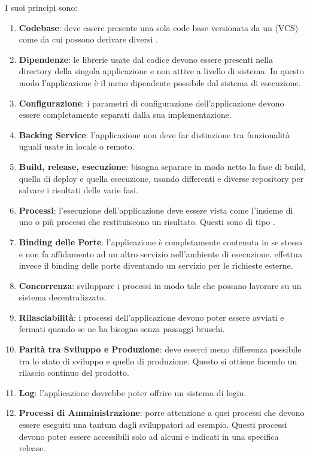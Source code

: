 I suoi principi sono:

\begin{enumerate}
	\item \textbf{Codebase}: deve essere presente una sola code base versionata da un  (VCS) come  da cui
	possono derivare diversi .
	\item \textbf{Dipendenze}: le librerie usate dal codice devono essere presenti nella directory della singola applicazione e non attive a livello di sistema. In questo modo l'applicazione è il meno dipendente possibile dal sistema di esecuzione.
	\item \textbf{Configurazione}: i parametri di configurazione dell'applicazione devono essere completamente separati dalla sua implementazione.
	\item \textbf{Backing Service}: l'applicazione non deve far distinzione tra funzionalità uguali usate in locale o remoto.
	\item \textbf{Build, release, esecuzione}: bisogna separare in modo netto la fase di build, quella di deploy e quella esecuzione, usando  differenti e diverse repository per salvare i risultati delle varie fasi.
	\item \textbf{Processi}: l'esecuzione dell'applicazione deve essere vista come l'insieme di uno o più processi che restituiscono un risultato. Questi sono di tipo .
	\item \textbf{Binding delle Porte}: l'applicazione è completamente contenuta in se stessa e non fa affidamento ad un altro servizio nell'ambiente di esecuzione. effettua invece il binding delle porte diventando un servizio per le richieste esterne.
	\item \textbf{Concorrenza}: sviluppare i processi in modo tale che possano lavorare su un sistema decentralizzato.
	\item \textbf{Rilasciabilità}: i processi dell'applicazione devono poter essere avviati e fermati quando se ne ha bisogno senza passaggi bruschi.
	\item \textbf{Parità tra Sviluppo e Produzione}: deve esserci meno differenza possibile tra lo stato di sviluppo e quello di produzione. Questo si ottiene facendo un rilascio continuo del prodotto.
	\item \textbf{Log}: l'applicazione dovrebbe poter offrire un sistema di login.
	\item \textbf{Processi di Amministrazione}: porre attenzione a quei processi che devono essere eseguiti una tantum dagli sviluppatori ad esempio. Questi processi devono poter essere accessibili solo ad alcuni e indicati in una specifica release.
\end{enumerate}

